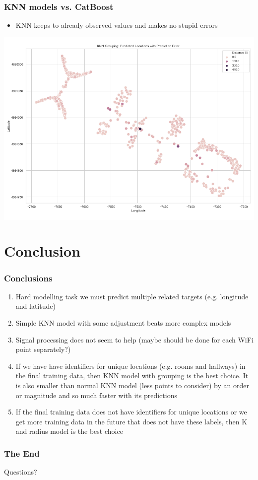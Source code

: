 \documentclass[10pt]{beamer}
\begin{document}
\begin{frame}
\frametitle{KNN models vs. CatBoost}

\begin{itemize}
    \item KNN keeps to already observed values and makes no stupid errors
\end{itemize}

\includegraphics[width=\textwidth,height=\textheight,keepaspectratio]{knn_grouping_error_of_predicted_locations.png}

\end{frame}

\section{Conclusion}

\begin{frame}
\frametitle{Conclusions}

\begin{enumerate}
    \item Hard modelling task we must predict multiple related targets (e.g. longitude and latitude)
    \pause
    \item Simple KNN model with some adjustment beats more complex models
    \pause
    \item Signal processing does not seem to help (maybe should be done for each WiFi point separately?)
    \pause
    \item If we have have identifiers for unique locations (e.g. rooms and hallways) in the final
    training data, then KNN model with grouping is the best choice. It is also smaller than normal KNN
    model (less points to consider) by an order or magnitude and so much faster with its predictions
    \pause
    \item If the final training data does not have identifiers for unique locations or we get more
    training data in the future that does not have these labels, then K and radius model is the best
    choice
\end{enumerate}

\end{frame}

\begin{frame}
\frametitle{The End}

\LARGE{\centerline{Questions?}}

\end{frame}

\end{document}
